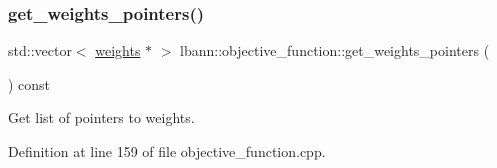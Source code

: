\mbox{\label{classlbann_1_1objective__function_a8e37f76e42f6f341ea3592001b3794e5}} 
\subsubsection{\texorpdfstring{get\+\_\+weights\+\_\+pointers()}{get\_weights\_pointers()}}
{\footnotesize\ttfamily std\+::vector$<$ \hyperlink{classlbann_1_1weights}{weights} $\ast$ $>$ lbann\+::objective\+\_\+function\+::get\+\_\+weights\+\_\+pointers (\begin{DoxyParamCaption}{ }\end{DoxyParamCaption}) const}

Get list of pointers to weights. 

Definition at line 159 of file objective\+\_\+function.\+cpp.


